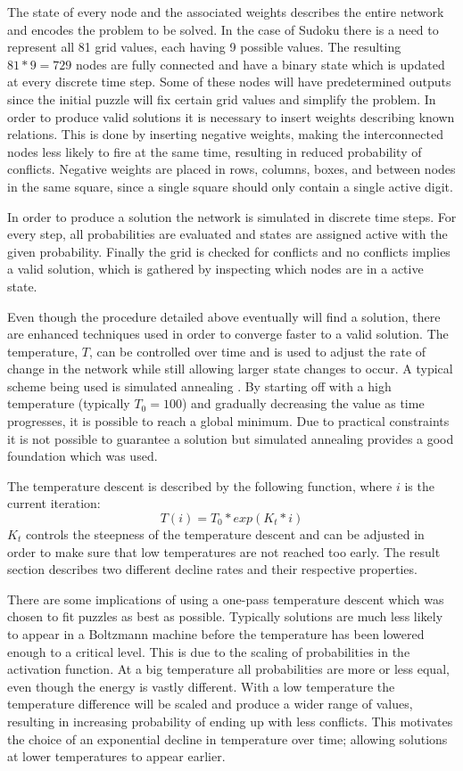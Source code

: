 \documentclass[a4paper,11pt]{kth-mag}
\begin{document}
The state of every node and the associated weights describes the entire network and encodes the problem to be solved.
In the case of Sudoku there is a need to represent all 81 grid values, each having 9 possible values.
The resulting $81*9=729$ nodes are fully connected and have a binary state which is updated at every discrete time step.
Some of these nodes will have predetermined outputs since the initial puzzle will fix certain grid values and simplify the problem.
In order to produce valid solutions it is necessary to insert weights describing known relations.
This is done by inserting negative weights, making the interconnected nodes less likely to fire at the same time, resulting in reduced probability of conflicts.
Negative weights are placed in rows, columns, boxes, and between nodes in the same square, since a single square should only contain a single active digit.

In order to produce a solution the network is simulated in discrete time steps.
For every step, all probabilities are evaluated and states are assigned active with the given probability.
Finally the grid is checked for conflicts and no conflicts implies a valid solution, which is gathered by inspecting which nodes are in a active state.

Even though the procedure detailed above eventually will find a solution, there are enhanced techniques used in order to converge faster to a valid solution.
The temperature, $T$, can be controlled over time and is used to adjust the rate of change in the network while still allowing larger state changes to occur.
A typical scheme being used is simulated annealing \cite{simulatedAnnealing}.
By starting off with a high temperature (typically $T_0 = 100$) and gradually decreasing the value as time progresses, it is possible to reach a global minimum.
Due to practical constraints it is not possible to guarantee a solution but simulated annealing provides a good foundation which was used.

The temperature descent is described by the following function, where $i$ is the current iteration:
\[
T(i) = T_0 * exp(K_t * i)
\]
$K_t$ controls the steepness of the temperature descent and can be adjusted in order to make sure that low temperatures are not reached too early.
The result section describes two different decline rates and their respective properties.

There are some implications of using a one-pass temperature descent which was chosen to fit puzzles as best as possible.
Typically solutions are much less likely to appear in a Boltzmann machine before the temperature has been lowered enough to a critical level.
This is due to the scaling of probabilities in the activation function.
At a big temperature all probabilities are more or less equal, even though the energy is vastly different.
With a low temperature the temperature difference will be scaled and produce a wider range of values, resulting in increasing probability of ending up with less conflicts.
This motivates the choice of an exponential decline in temperature over time; allowing solutions at lower temperatures to appear earlier.
\end{document}
